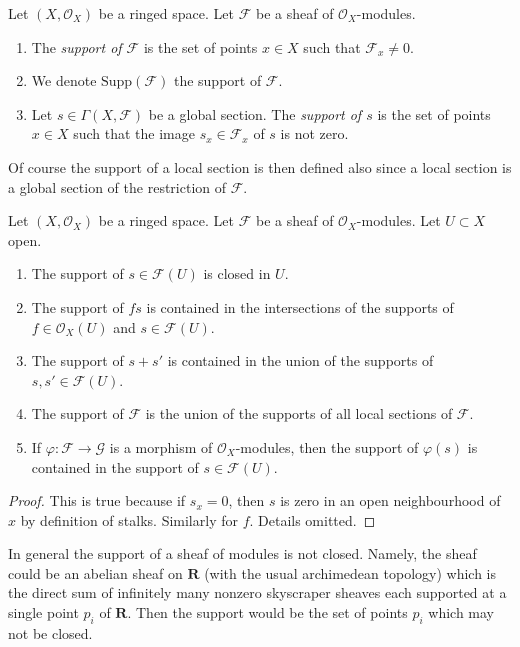 \begin{definition}
\label{definition-support}
Let $(X, \mathcal{O}_X)$ be a ringed space.
Let $\mathcal{F}$ be a sheaf of $\mathcal{O}_X$-modules.
\begin{enumerate}
\item The {\it support of $\mathcal{F}$} is the set of
points $x \in X$ such that $\mathcal{F}_x \not = 0$.
\item We denote $\text{Supp}(\mathcal{F})$ the support of $\mathcal{F}$.
\item Let $s \in \Gamma(X, \mathcal{F})$ be a global section.
The {\it support of $s$} is the set of points $x \in X$
such that the image $s_x \in \mathcal{F}_x$ of $s$ is
not zero.
\end{enumerate}
\end{definition}

\noindent
Of course the support of a local section is then defined also
since a local section is a global section of the restriction of
$\mathcal{F}$.

\begin{lemma}
\label{lemma-support-section-closed}
Let $(X, \mathcal{O}_X)$ be a ringed space.
Let $\mathcal{F}$ be a sheaf of $\mathcal{O}_X$-modules.
Let $U \subset X$ open.
\begin{enumerate}
\item The support of $s \in \mathcal{F}(U)$ is closed in $U$.
\item The support of $fs$ is contained in the intersections
of the supports of $f \in \mathcal{O}_X(U)$ and $s \in \mathcal{F}(U)$.
\item The support of $s + s'$ is contained in the union of
the supports of $s, s' \in \mathcal{F}(U)$.
\item The support of $\mathcal{F}$ is the union of the supports
of all local sections of $\mathcal{F}$.
\item If $\varphi : \mathcal{F} \to \mathcal{G}$ is a morphism of
$\mathcal{O}_X$-modules, then the support of $\varphi(s)$ is
contained in the support of $s \in \mathcal{F}(U)$.
\end{enumerate}
\end{lemma}

\begin{proof}
This is true because if $s_x = 0$, then $s$ is zero
in an open neighbourhood of $x$ by definition of stalks.
Similarly for $f$. Details omitted.
\end{proof}

\noindent
In general the support of a sheaf of modules is not closed.
Namely, the sheaf could be an abelian sheaf on $\mathbf{R}$
(with the usual archimedean topology)
which is the direct sum of infinitely many nonzero skyscraper
sheaves each supported at a single point $p_i$ of $\mathbf{R}$.
Then the support would be the set of points $p_i$
which may not be closed.

